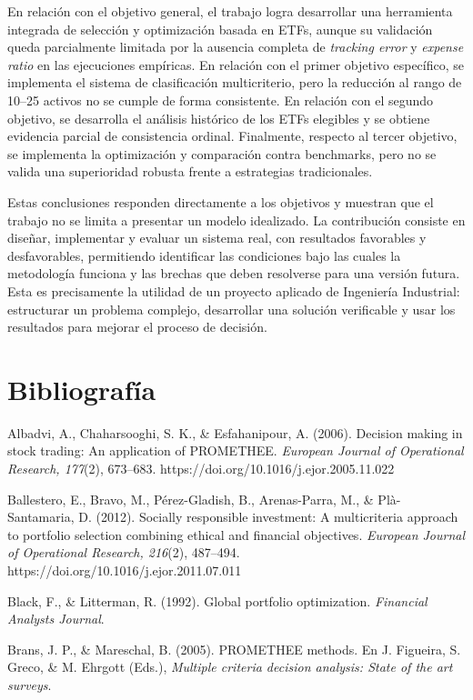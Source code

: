 \documentclass[12pt,letterpaper]{article}
\newcommand{\apa}[1]{\begingroup\sloppy\hangindent=1.25cm\hangafter=1 #1\par\vspace{0.35em}\endgroup}
\begin{document}
En relación con el objetivo general, el trabajo logra desarrollar una herramienta integrada de selección y optimización basada en ETFs, aunque su validación queda parcialmente limitada por la ausencia completa de \textit{tracking error} y \textit{expense ratio} en las ejecuciones empíricas. En relación con el primer objetivo específico, se implementa el sistema de clasificación multicriterio, pero la reducción al rango de 10--25 activos no se cumple de forma consistente. En relación con el segundo objetivo, se desarrolla el análisis histórico de los ETFs elegibles y se obtiene evidencia parcial de consistencia ordinal. Finalmente, respecto al tercer objetivo, se implementa la optimización y comparación contra benchmarks, pero no se valida una superioridad robusta frente a estrategias tradicionales.

Estas conclusiones responden directamente a los objetivos y muestran que el trabajo no se limita a presentar un modelo idealizado. La contribución consiste en diseñar, implementar y evaluar un sistema real, con resultados favorables y desfavorables, permitiendo identificar las condiciones bajo las cuales la metodología funciona y las brechas que deben resolverse para una versión futura. Esta es precisamente la utilidad de un proyecto aplicado de Ingeniería Industrial: estructurar un problema complejo, desarrollar una solución verificable y usar los resultados para mejorar el proceso de decisión.


\section{Bibliografía}
\label{sec:bibliografia}

\apa{Albadvi, A., Chaharsooghi, S. K., \& Esfahanipour, A. (2006). Decision making in stock trading: An application of PROMETHEE. \textit{European Journal of Operational Research, 177}(2), 673--683. https://doi.org/10.1016/j.ejor.2005.11.022}

\apa{Ballestero, E., Bravo, M., Pérez-Gladish, B., Arenas-Parra, M., \& Plà-Santamaria, D. (2012). Socially responsible investment: A multicriteria approach to portfolio selection combining ethical and financial objectives. \textit{European Journal of Operational Research, 216}(2), 487--494. https://doi.org/10.1016/j.ejor.2011.07.011}

\apa{Black, F., \& Litterman, R. (1992). Global portfolio optimization. \textit{Financial Analysts Journal}.}

\apa{Brans, J. P., \& Mareschal, B. (2005). PROMETHEE methods. En J. Figueira, S. Greco, \& M. Ehrgott (Eds.), \textit{Multiple criteria decision analysis: State of the art surveys}.}
\end{document}
